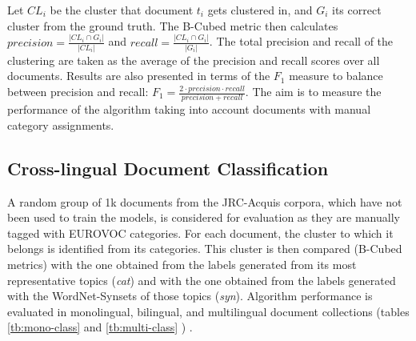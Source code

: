 Let $CL_i$ be the cluster that document $t_i$ gets clustered in, and $G_i$ its correct cluster from the ground truth. The B-Cubed metric then calculates $precision=\frac{|CL_i \cap G_i|}{|CL_i|}$ and $recall=\frac{|CL_i \cap G_i|}{|G_i|}$. The total precision and recall of the clustering are taken as the average of the precision and recall scores over all documents. Results are also presented in terms of the $F_1$ measure to balance between precision and recall: $F_1=\frac{2 \cdot precision \cdot recall}{precision + recall}$. The aim is to measure the performance of the algorithm taking into account documents with manual category assignments.

\subsection{Cross-lingual Document Classification}
\label{sec:cl-doc-class}
A random group of 1k documents from the JRC-Acquis corpora, which have not been used to train the models, is considered for evaluation as they are manually tagged with EUROVOC categories. For each document, the cluster to which it belongs is identified from its categories. This cluster is then compared (B-Cubed metrics) with the one obtained from the labels generated from its most representative topics (\textit{cat}) and with the one obtained from the labels generated with the WordNet-Synsets of those topics (\textit{syn}). Algorithm performance is evaluated in monolingual, bilingual, and multilingual document collections (tables \ref{tb:mono-class} and \ref{tb:multi-class} ) .

